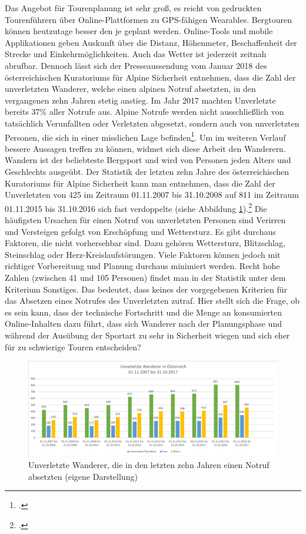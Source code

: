 Das Angebot für Tourenplanung ist sehr groß, es reicht von gedruckten Tourenführern über Online-Plattformen zu GPS-fähigen Wearables. Bergtouren können heutzutage besser den je geplant werden. Online-Tools und mobile Applikationen geben Auskunft über die Distanz, Höhenmeter, Beschaffenheit der Strecke und Einkehrmöglichkeiten. Auch das Wetter ist jederzeit zeitnah abrufbar. Dennoch lässt sich der Presseaussendung vom Januar 2018 des österreichischen Kuratoriums für Alpine Sicherheit entnehmen, dass die Zahl der unverletzten Wanderer, welche einen alpinen Notruf absetzten, in den vergangenen zehn Jahren stetig anstieg. Im Jahr 2017 machten Unverletzte bereits 37\% aller Notrufe aus. Alpine Notrufe werden nicht ausschließlich von tatsächlich Verunfallten oder Verletzten abgesetzt, sondern auch von unverletzten Personen, die sich in einer misslichen Lage befinden\footcite{kurasi}.
Um im weiteren Verlauf bessere Aussagen treffen zu können, widmet sich diese Arbeit den Wanderern. Wandern ist der beliebteste Bergsport und wird von Personen jeden Alters und Geschlechts ausgeübt.
Der Statistik der letzten zehn Jahre des österreichischen Kuratoriums für Alpine Sicherheit kann man entnehmen, dass die Zahl der Unverletzten von 425 im Zeitraum 01.11.2007 bis 31.10.2008 auf 811 im Zeitraum 01.11.2015 bis 31.10.2016 sich fast verdoppelte (siehe Abbildung \ref{fig:uwan}).\footcite{kurasi} Die häufigsten Ursachen für einen Notruf von unverletzten Personen sind {\glqq Verirren und Versteigen\grqq} gefolgt von {\glqq Erschöpfung\grqq}  und {\glqq Wettersturz\grqq}. Es gibt durchaus Faktoren, die nicht vorhersehbar sind. Dazu gehören Wettersturz, Blitzschlag, Steinschlag oder Herz-Kreislaufstörungen. Viele Faktoren können jedoch mit richtiger Vorbereitung und Planung durchaus minimiert werden. Recht hohe Zahlen (zwischen 41 und 105 Personen) findet man in der Statistik unter dem Kriterium {\glqq Sonstiges\grqq}. Das bedeutet, dass keines der vorgegebenen Kriterien für das Absetzen eines Notrufes des Unverletzten zutraf. Hier stellt sich die Frage, ob es sein kann, dass der technische Fortschritt und die Menge an konsumierten Online-Inhalten dazu führt, dass sich Wanderer nach der Planungsphase und während der Ausübung der Sportart zu sehr in Sicherheit wiegen und sich eher für zu schwierige Touren entscheiden?
\begin{figure}
	\centering
\includegraphics[width=1\linewidth]{content/uwan}
\caption{Unverletzte Wanderer, die in den letzten zehn Jahren einen Notruf absetzten (eigene Darstellung)}
\label{fig:uwan}
\end{figure}



